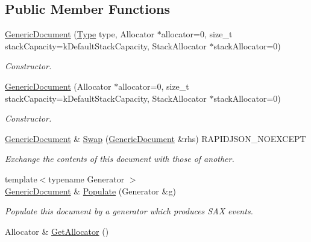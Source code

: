 \subsection*{Public Member Functions}
\begin{DoxyCompactItemize}
\item 
\hyperlink{classGenericDocument_a3da21e72ec8f26b9da77d86cc1d41cdd}{Generic\+Document} (\hyperlink{rapidjson_8h_a1d1cfd8ffb84e947f82999c682b666a7}{Type} type, Allocator $\ast$allocator=0, size\+\_\+t stack\+Capacity=k\+Default\+Stack\+Capacity, Stack\+Allocator $\ast$stack\+Allocator=0)
\begin{DoxyCompactList}\small\item\em Constructor. \end{DoxyCompactList}\item 
\hyperlink{classGenericDocument_a6b1c313ad538cafc4d23d4bd5f97178c}{Generic\+Document} (Allocator $\ast$allocator=0, size\+\_\+t stack\+Capacity=k\+Default\+Stack\+Capacity, Stack\+Allocator $\ast$stack\+Allocator=0)
\begin{DoxyCompactList}\small\item\em Constructor. \end{DoxyCompactList}\item 
\hyperlink{classGenericDocument}{Generic\+Document} \& \hyperlink{classGenericDocument_a6290e1290fad74177625af5938c0c58f}{Swap} (\hyperlink{classGenericDocument}{Generic\+Document} \&rhs) R\+A\+P\+I\+D\+J\+S\+O\+N\+\_\+\+N\+O\+E\+X\+C\+E\+PT
\begin{DoxyCompactList}\small\item\em Exchange the contents of this document with those of another. \end{DoxyCompactList}\item 
{\footnotesize template$<$typename Generator $>$ }\\\hyperlink{classGenericDocument}{Generic\+Document} \& \hyperlink{classGenericDocument_a36fbc7d0a9595d26e0d2c8859d207d1f}{Populate} (Generator \&g)
\begin{DoxyCompactList}\small\item\em Populate this document by a generator which produces S\+AX events. \end{DoxyCompactList}\item 
Allocator \& \hyperlink{classGenericDocument_aa4609d6b19f86aec1a6b96edf2c27686}{Get\+Allocator} ()\hypertarget{classGenericDocument_aa4609d6b19f86aec1a6b96edf2c27686}{}\label{classGenericDocument_aa4609d6b19f86aec1a6b96edf2c27686}


\end{DoxyCompactItemize}
